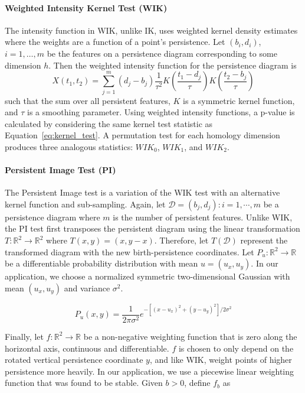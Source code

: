 \documentclass[12pt]{article}
\begin{document}
\paragraph{Weighted Intensity Kernel Test (WIK)}
The intensity function in WIK, unlike IK, uses weighted kernel density estimates \citep{chen2015statistical} where the weights are a function of a point's persistence. Let $(b_i, d_i)$, $i = 1, \ldots, m$ be the features on a persistence diagram corresponding to some dimension $h$. Then the weighted intensity function for the persistence diagram is
%
\[ X(t_1, t_2) = \sum_{j=1}^m(d_{j} - b_{j})\frac{1}{\tau^{2}}K \left(\frac{t_1-d_{j}}{\tau}\right)K \left(\frac{t_2-b_{j}}{\tau}\right)\]
%
such that the sum over all persistent features, $K$ is a symmetric kernel function, and $\tau$ is a smoothing parameter. Using weighted intensity functions, a p-value is calculated by considering the same kernel test statistic as Equation~\eqref{eq:kernel_test}. A permutation test for each homology dimension produces three analogous statistics: $WIK_0$, $WIK_1$, and $WIK_2$.

\paragraph{Persistent Image Test (PI)} The Persistent Image test \citep{adams2015persistent} is a variation of the WIK test with an alternative kernel function and sub-sampling. Again, let $\mathcal{D} = {(b_{j} , d_{j}) : i = 1, \cdots ,m}$ be a persistence diagram where $m$ is the number of persistent features. Unlike WIK, the PI test first transposes the persistent diagram using the linear transformation $T: \mathbb{R}^{2} \rightarrow \mathbb{R}^{2}$ where $T(x,y) = (x, y-x)$. Therefore, let $T(\mathcal{D})$ represent the transformed diagram with the new birth-persistence coordinates. Let $P_{u} : \mathbb{R}^{2} \rightarrow \mathbb{R}$ be a differentiable probability distribution with mean $u = (u_{x}, u_{y})$. In our application, we choose a normalized symmetric two-dimensional Gaussian with mean $(u_{x}, u_{y})$ and variance $\sigma^{2}$.

\[ P_{u}(x,y) = \frac{1}{2\pi\sigma^{2}}e^{-[(x - u_{x})^{2} + (y-u_{y})^{2}]/2\sigma^{2}} \]

Finally, let $f : \mathbb{R}^{2} \rightarrow \mathbb{R}$ be a non-negative weighting function that is zero along the horizontal axis, continuous and differentiable. $f$ is chosen to only depend on the rotated vertical persistence coordinate $y$, and like WIK, weight points of higher persistence more heavily. In our application, we use a piecewise linear weighting function that was found to be stable. Given $b > 0$, define $f_{b}$ as
\end{document}
